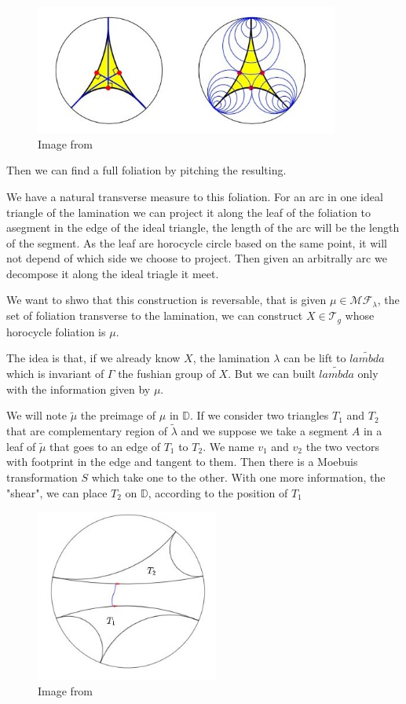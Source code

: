 \begin{figure}[h!]
\centering
\includegraphics[width=10cm]{Image/FoliationTri.jpg}
\caption{Image from \cite{Martelli2016AnIT}}
\end{figure}

Then we can find a full foliation by pitching the resulting.

We have a natural transverse measure to this foliation. For an arc in one ideal triangle of the lamination we can project it along the leaf of the foliation to asegment in the edge of the ideal triangle, the length of the arc will be the length of the segment. As the leaf are horocycle circle based on the same point, it will not depend of which side we choose to project. Then given an arbitrally arc we decompose it along the ideal triagle it meet.

We want to shwo that this construction is reversable, that is given $\mu \in \mathcal{MF}_\lambda $, the set of foliation transverse to the lamination, we can
construct $X \in \mathcal{T}_g$ whose horocycle foliation is $\mu$.

The idea is that, if we already know $X$, the lamination $\lambda$ can be lift to $\tilde{lambda}$ which is invariant of $\Gamma$ the fushian group of $X$. But we can built $\tilde{lambda}$ only with the information given by $\mu$.

We will note $\tilde{\mu}$ the preimage of $\mu$ in $\mathbb{D}$. If we consider two triangles $T_1$ and $T_2$  that are complementary region of $\tilde{\lambda}$ and we suppose we take a segment $A$ in a leaf of $\tilde{\mu}$ that goes to an edge of $T_1$ to $T_2$. We name $v_1$ and $v_2$ the two vectors with footprint in the edge and tangent to them. Then there is a Moebuis transformation $S$ which take one to the other. With one more information, the "shear", we can place $T_2$ on $\mathbb{D}$, according to the position of $T_1$

\begin{figure}[h!]
\centering
\includegraphics[width=6cm]{Image/Foliation.jpg}
\caption{Image from \cite{wright2018mirzakhani}}
\end{figure}

